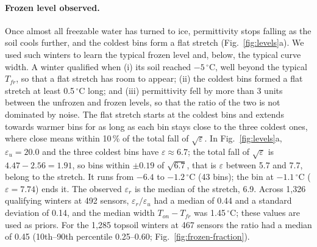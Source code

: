 \documentclass[essd,manuscript]{copernicus}
\begin{document}
\paragraph{Frozen level observed.} Once almost all freezable water has
turned to ice, permittivity stops falling as the soil cools further, and the
coldest bins form a flat stretch (Fig.~\ref{fig:levels}a). We used such
winters to learn the typical frozen level and, below, the typical curve width. A winter qualified when (i) its soil
reached $-5$\,$^{\circ}$C, well beyond the typical $T_{fr}$, so that a flat
stretch has room to appear; (ii) the coldest bins formed a flat stretch at
least 0.5\,$^{\circ}$C long; and (iii) permittivity fell by more than 3 units
between the unfrozen and frozen levels, so that the ratio of the two is not
dominated by noise. The flat stretch starts at the coldest bins and extends
towards warmer bins for as long as each bin stays close to the three coldest
ones, where close means within 10\,\% of the total fall of $\sqrt{\varepsilon}$.
In Fig.~\ref{fig:levels}a, $\varepsilon_u = 20.0$ and the three coldest bins
have $\varepsilon \approx 6.7$; the total fall of $\sqrt{\varepsilon}$ is
$4.47-2.56 = 1.91$, so bins within $\pm0.19$ of $\sqrt{6.7}$, that is
$\varepsilon$ between 5.7 and 7.7, belong to the stretch. It runs from
$-6.4$ to $-1.2$\,$^{\circ}$C (43 bins); the bin at $-1.1$\,$^{\circ}$C
($\varepsilon = 7.74$) ends it. The observed $\varepsilon_r$ is the median of
the stretch, 6.9. Across 1,326 qualifying winters at 492 sensors,
$\varepsilon_r/\varepsilon_u$ had a median of 0.44 and a standard deviation of
0.14, and the median width $T_{on}-T_{fr}$ was 1.45\,$^{\circ}$C; these values
are used as priors. For the 1,285 topsoil winters at 467 sensors the ratio
had a median of 0.45 (10th--90th percentile 0.25--0.60;
Fig.~\ref{fig:frozen-fraction}).
\end{document}
